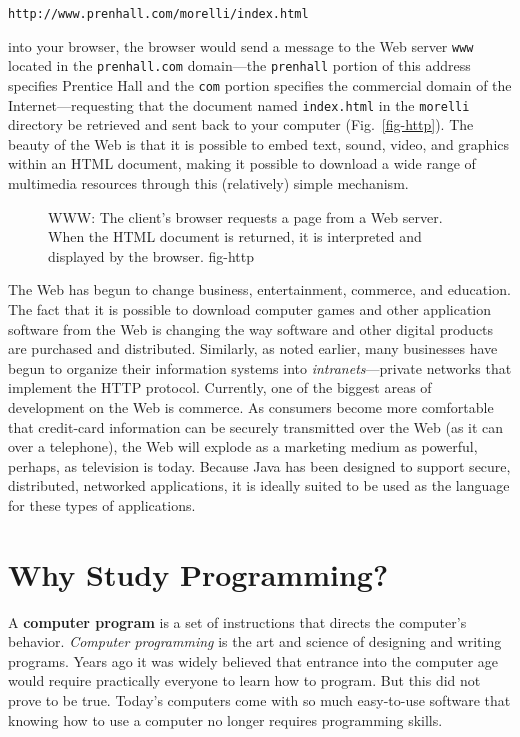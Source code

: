 \WWW
\begin{jjjlisting}
\begin{lstlisting}[commentstyle=\color{black}\small]
http://www.prenhall.com/morelli/index.html
\end{lstlisting}
\end{jjjlisting}

\noindent into your browser, the browser would send a message to the
Web server {\tt www} located in the {\tt prenhall.com} domain---the
{\tt prenhall} portion of this address specifies Prentice Hall and
the {\tt com} portion specifies the commercial domain of the
Internet---requesting that the document named \mbox{\tt index.html} 
in the {\tt morelli}
directory be retrieved and sent back to your computer
(Fig.~\ref{fig-http}). The beauty of the Web is that it is possible
to embed text, sound, video, and graphics within an HTML document,
making it possible to download a wide range of multimedia resources
through this (relatively) simple mechanism.

\begin{figure}[tb]
{WWW: The client's browser requests a page from
a Web server.  When the HTML document is returned, it is
interpreted and displayed by the browser.
} {fig-http}
\end{figure}

The Web has begun to change business, entertainment, commerce, and
education.  The fact that it is possible to download computer games
and other application software from the Web is changing the way software
and other digital products are purchased and distributed.  Similarly,
as noted earlier, many businesses have begun to organize their
information systems into {\em intranets}---private networks that implement
the HTTP protocol.  Currently, one of the biggest areas of development
on the Web is commerce.  As consumers become more comfortable
that credit-card information can be securely transmitted over the Web (as
it can over a telephone), the Web will explode as a marketing medium
as powerful, perhaps, as television is today.  Because Java has been
designed to support secure, distributed, networked applications, it is
ideally suited to be used as the language for these types of
applications.

\section{Why Study Programming?}
\noindent A {\bf computer program} is a set of instructions that directs
the computer's behavior.  {\it Computer programming} is the art and
science of designing and writing programs.  Years ago it was widely
believed that entrance into the computer age would require practically
everyone to learn how to program.  But this did not prove to be true.
Today's computers come with so much easy-to-use software that knowing
how to use a computer no longer requires programming skills.


